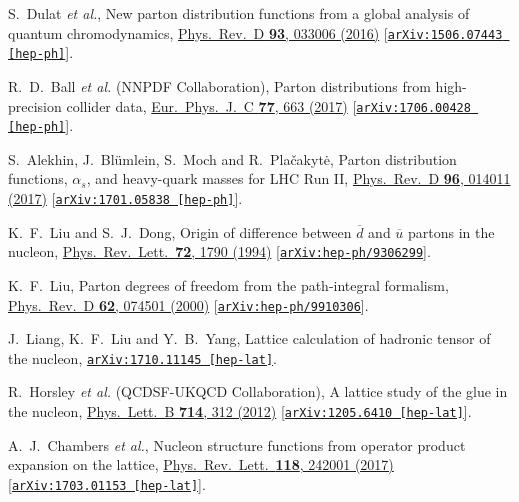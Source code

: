 \documentclass[aps,prl,reprint,groupedaddress, preprintnumbers]{revtex4-1}
\begin{document}
\begin{thebibliography}{50}
 
  S.~Dulat {\it et al.},
  New parton distribution functions from a global analysis of quantum chromodynamics,
  \href{https://doi.org/10.1103/PhysRevD.93.033006}{Phys.\ Rev.\ D {\bf 93},  033006 (2016)}
   [\href{https://arxiv.org/abs/1506.07443}{\tt arXiv:1506.07443 [hep-ph]}].
  
 
  R.~D.~Ball {\it et al.} (NNPDF Collaboration),
  Parton distributions from high-precision collider data,
  \href{https://doi.org/10.1140/epjc/s10052-017-5199-5}{Eur.\ Phys.\ J.\ C {\bf 77},  663 (2017)}
  [\href{https://arxiv.org/abs/1706.00428}{\tt arXiv:1706.00428 [hep-ph]}].
  
  
 S.~Alekhin, J.~Bl\"umlein, S.~Moch and R.~Pla\v{c}akyt\.e,
 Parton distribution functions, $\alpha_s$, and heavy-quark masses for LHC Run II,
 \href{https://doi.org/10.1103/PhysRevD.96.014011}{Phys.\ Rev.\ D {\bf 96}, 014011 (2017)}
  [\href{https://arxiv.org/abs/1701.05838}{\tt arXiv:1701.05838 [hep-ph]}].

  
  K.~F.~Liu and S.~J.~Dong,
  Origin of difference between $\overline d$ and $\overline u$ partons in the nucleon,
  \href{https://doi.org/10.1103/PhysRevLett.72.1790}{Phys.\ Rev.\ Lett.\  {\bf 72}, 1790 (1994)}
  [\href{https://arxiv.org/abs/hep-ph/9306299}{\tt arXiv:hep-ph/9306299}].
  
  
  K.~F.~Liu,
  Parton degrees of freedom from the path-integral formalism,
  \href{https://doi.org/10.1103/PhysRevD.62.074501}{Phys.\ Rev.\ D {\bf 62}, 074501 (2000)}
  [\href{https://arxiv.org/abs/hep-ph/9910306}{\tt arXiv:hep-ph/9910306}].
  
 
  J.~Liang, K.~F.~Liu and Y.~B.~Yang,
  Lattice calculation of hadronic tensor of the nucleon,
  \href{https://arxiv.org/abs/1710.11145}{\tt arXiv:1710.11145 [hep-lat]}.  
  
  
  R.~Horsley {\it et al.} (QCDSF-UKQCD Collaboration),
  A lattice study of the glue in the nucleon,
  \href{https://doi.org/10.1016/j.physletb.2012.07.004}{Phys.\ Lett.\ B {\bf 714}, 312 (2012)}
  [\href{https://arxiv.org/abs/1205.6410}{\tt arXiv:1205.6410 [hep-lat]}].
    
    
  A.~J.~Chambers {\it et al.},
  Nucleon structure functions from operator product expansion on the lattice,
  \href{https://doi.org/10.1103/PhysRevLett.118.242001}{Phys.\ Rev.\ Lett.\  {\bf 118}, 242001 (2017)}
  [\href{https://arxiv.org/abs/1703.01153}{\tt arXiv:1703.01153 [hep-lat]}]. 
  

\end{thebibliography}
\end{document}
